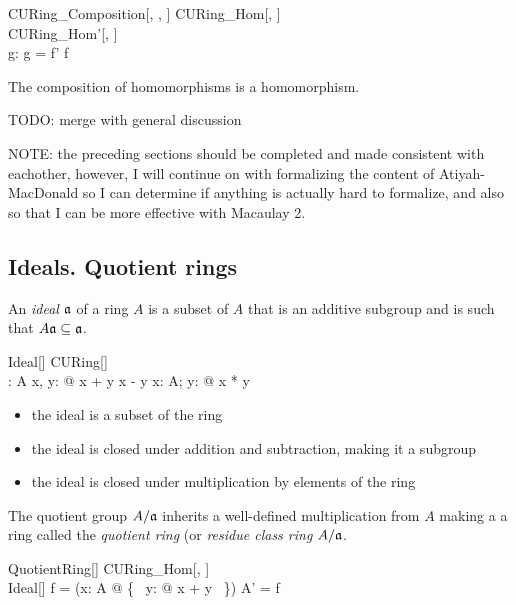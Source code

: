\documentclass{amsart}
\begin{document}
\begin{schema}{CURing\_Composition}[\genT, \genU, \genV]
	CURing\_Hom[\genT, \genU] \\
	CURing\_Hom'[\genU, \genV] \\
	g: \genT \pfun \genV
\where
	g = f' \circ f
\end{schema}

\begin{remark}
The composition of homomorphisms is a homomorphism.
\end{remark}

TODO: merge with general discussion

NOTE: the preceding sections should be completed and made consistent with eachother,
however, I will continue on with formalizing the content of Atiyah-MacDonald so I can determine
if anything is actually hard to formalize, and also so that I can be more effective with Macaulay 2.

\subsection{Ideals. Quotient rings}

An \textit{ideal} $\mathfrak{a}$ of a ring $A$ is a subset of $A$ that is an additive subgroup
and is such that $A\mathfrak{a} \subseteq \mathfrak{a}$.

\begin{schema}{Ideal}[\genT]
	CURing[\genT] \\
	\fraka: \power \genT
\where
	\fraka \subseteq A
\also
	\forall x, y: \fraka @ x + y \in \fraka \land x - y \in \fraka
\also
	\forall x: A; y: \fraka @ x * y \in \fraka
\end{schema}

\begin{itemize}
	\item the ideal is a subset of the ring
	\item the ideal is closed under addition and subtraction, making it a subgroup
	\item the ideal is closed under multiplication by elements of the ring
\end{itemize}

The quotient group $A/\mathfrak{a}$ inherits a well-defined multiplication from $A$
making a a ring called the \textit{quotient ring} (or \textit{residue class ring} $A/\mathfrak{a}$.

\begin{schema}{QuotientRing}[\genT]
	CURing\_Hom[\genT, \power \genT] \\
	Ideal[\genT]
\where
	f = (\lambda x: A @ \{~ y: \fraka @ x + y ~\})
\also
	A' = \ran f
\end{schema}
\end{document}

